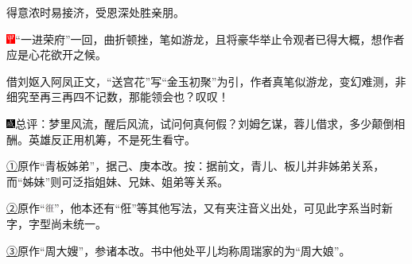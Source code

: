 得意浓时易接济，受恩深处胜亲朋。

{\includegraphics[width=3mm]{../Images/00002}``一进荣府''一回，曲折顿挫，笔如游龙，且将豪华举止令观者已得大概，想作者应是心花欲开之候。}

{借刘妪入阿凤正文，``送宫花''写``金玉初聚''为引，作者真笔似游龙，变幻难测，非细究至再三再四不记数，那能领会也？叹叹！}

{\includegraphics[width=3mm]{../Images/00005}总评：梦里风流，醒后风流，试问何真何假？刘姆乞谋，蓉儿借求，多少颠倒相酬。英雄反正用机筹，不是死生看守。}

{\href{../Text/part0010_split_000.html\#navto_1_a}{①}原作``青板姊弟''，据己、庚本改。按：据前文，青儿、板儿并非姊弟关系，而``姊妹''则可泛指姐妹、兄妹、姐弟等关系。}

{\href{../Text/part0010_split_000.html\#navto_2_a}{②}原作``\includegraphics[width=3mm]{../images/00017}''，他本还有``俇''等其他写法，又有夹注音义出处，可见此字系当时新字，字型尚未统一。}

{\href{../Text/part0010_split_000.html\#navto_3_a}{③}原作``周大嫂''，参诸本改。书中他处平儿均称周瑞家的为``周大娘''。}
